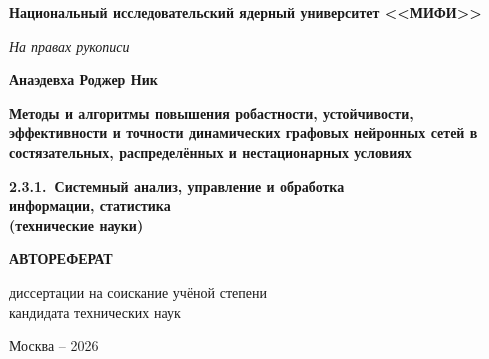 \documentclass[12pt,a5paper]{article}
\begin{document}
\sloppy

\thispagestyle{empty}

\begin{center}
\textbf{Национальный исследовательский ядерный университет <<МИФИ>>}

\vspace{1cm}

\textit{На правах рукописи}

\vspace{2cm}

\textbf{Анаэдевха Роджер Ник}

\vspace{1.5cm}

{\large \textbf{Методы и алгоритмы повышения
робастности, устойчивости, эффективности и точности динамических
графовых нейронных сетей в состязательных,
распределённых и нестационарных условиях}}

\vspace{1.5cm}

\textbf{2.3.1.\ Системный анализ, управление и обработка\\
информации, статистика\\
(технические науки)}

\vspace{2cm}

\textbf{АВТОРЕФЕРАТ}

\vspace{0.5cm}

диссертации на соискание учёной степени\\
кандидата технических наук

\vfill

Москва -- 2026
\end{center}

\newpage

\thispagestyle{empty}
\enlargethispage{1.5cm}
\end{document}
